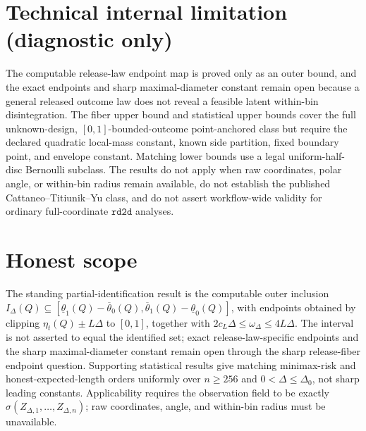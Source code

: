 \documentclass{article}
\begin{document}
\section*{Technical internal limitation (diagnostic only)}

The computable release-law endpoint map is proved only as an outer bound, and the exact endpoints and sharp maximal-diameter constant remain open because a general released outcome law does not reveal a feasible latent within-bin disintegration.  The fiber upper bound and statistical upper bounds cover the full unknown-design, \([0,1]\)-bounded-outcome point-anchored class but require the declared quadratic local-mass constant, known side partition, fixed boundary point, and envelope constant.  Matching lower bounds use a legal uniform-half-disc Bernoulli subclass.  The results do not apply when raw coordinates, polar angle, or within-bin radius remain available, do not establish the published Cattaneo--Titiunik--Yu class, and do not assert workflow-wide validity for ordinary full-coordinate \(\texttt{rd2d}\) analyses.

\section{Honest scope}

The standing partial-identification result is the computable outer inclusion \(I_\Delta(Q)\subseteq[\underline{\theta}_1(Q)-\overline{\theta}_0(Q),\overline{\theta}_1(Q)-\underline{\theta}_0(Q)]\), with endpoints obtained by clipping \(\eta_t(Q)\pm L\Delta\) to \([0,1]\), together with \(2c_L\Delta\leq\omega_\Delta\leq4L\Delta\). The interval is not asserted to equal the identified set; exact release-law-specific endpoints and the sharp maximal-diameter constant remain open through the sharp release-fiber endpoint question. Supporting statistical results give matching minimax-risk and honest-expected-length orders uniformly over \(n\geq256\) and \(0<\Delta\leq\Delta_0\), not sharp leading constants. Applicability requires the observation field to be exactly \(\sigma(Z_{\Delta,1},\ldots,Z_{\Delta,n})\); raw coordinates, angle, and within-bin radius must be unavailable.
\end{document}
